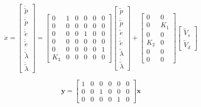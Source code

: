\begin{equation}
    \dot{x}=\left[{\begin{array}{*{20}{c}}
    {\dot{\tilde p}}\\
    {\ddot{\tilde p}}\\
    {\dot{\tilde e}}\\
    {\ddot{\tilde e}}\\
    {\dot{\tilde \lambda }}\\
    {\ddot {\tilde \lambda} }
    \end{array}} \right] = \left[ {\begin{array}{*{20}{c}}
    0&1&0&0&0&0\\
    0&0&0&0&0&0\\
    0&0&0&1&0&0\\
    0&0&0&0&0&0\\
    0&0&0&0&0&1\\
    {{K_3}}&0&0&0&0&0
    \end{array}} \right]\left[ {\begin{array}{*{20}{c}}
    {\tilde p}\\
    {\dot {\tilde p}}\\
    {\tilde e}\\
    {\dot {\tilde e}}\\
    {\tilde \lambda }\\
    {\dot {\tilde \lambda} }
    \end{array}} \right] + \left[ {\begin{array}{*{20}{c}}
    0&0\\
    0&{{K_1}}\\
    0&0\\
    {{K_2}}&0\\
    0&0\\
    0&0
    \end{array}} \right]\left[ {\begin{array}{*{20}{c}}
    {{{\tilde V}_s}}\\
    {{{\tilde V}_d}}
    \end{array}} \right]
\end{equation}

\begin{equation}
    \textbf{y} = \left[ {\begin{array}{*{20}{c}}
    1&0&0&0&0&0\\
    0&0&1&0&0&0\\
    0&0&0&0&1&0
\end{array}} \right]\textbf{x}
\end{equation}

